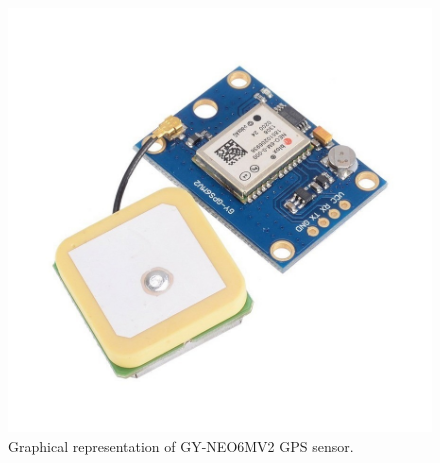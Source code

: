 \begin{figure}[p]
    \centering
    \includegraphics[width=0.5\linewidth]{GY-NEO6MV2-GPS}
    \caption{Graphical representation of GY-NEO6MV2 GPS sensor.}
    \label{fig:GY-NEO6MV2-GPS}
\end{figure}
